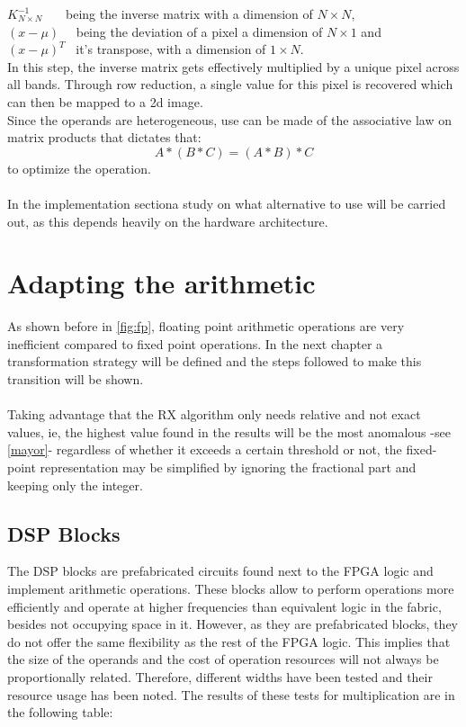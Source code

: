 \indent \(K^{-1}_{N \times N}\) \ \ \ being the inverse matrix with a dimension of \(N \times N\),\\
\indent \((x-\mu)\) \ \	being the deviation of a pixel a dimension of \(N \times 1\) and \\			
\indent \((x-\mu)^{T}\) \ it's transpose, with a dimension of \(1 \times N\).\\

\noindent In this step, the inverse matrix gets effectively multiplied by a unique pixel across all bands. Through row reduction, a single value for this pixel is recovered which can then be mapped to a 2d image.\\

Since the operands are heterogeneous, use can be made of the associative law on matrix products that dictates that:
	\[A * (B * C) = (A * B) * C\]
	to optimize the operation.\\


\paragraph{}
\label{alternativa}
In the implementation sectiona study on what alternative to use will be carried out, as this depends heavily on the hardware architecture.

\section{Adapting the arithmetic}
As shown before in \autoref{fig:fp}, floating point arithmetic operations are very inefficient compared to fixed point operations. In the next chapter a transformation strategy will be defined and the steps followed to make this transition will be shown.
\\
\\
Taking advantage that the RX algorithm only needs relative and not exact values, ie, the highest value found in the results will be the most anomalous -see \ref{mayor}- regardless of whether it exceeds a certain threshold or not, the fixed-point representation may be simplified by ignoring the fractional part and keeping only the integer.

\subsection{DSP Blocks}
The DSP blocks are prefabricated circuits found next to the FPGA logic and implement arithmetic operations. These blocks allow to perform operations more efficiently and operate at higher frequencies than equivalent logic in the fabric, besides not occupying space in it. However, as they are prefabricated blocks, they do not offer the same flexibility as the rest of the FPGA logic. This implies that the size of the operands and the cost of operation resources will not always be proportionally related. Therefore, different widths have been tested and their resource usage has been noted. The results of these tests for multiplication are in the following table:

